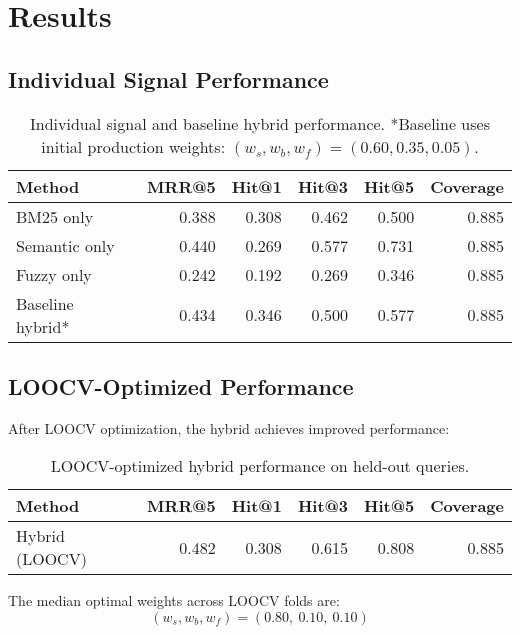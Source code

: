 \section{Results}
\label{sec:evaluation-results}

\subsection{Individual Signal Performance}

\begin{table}[!ht]
\centering
\small
\begin{tabular}{lrrrrr}
\toprule
\textbf{Method} & \textbf{MRR@5} & \textbf{Hit@1} & \textbf{Hit@3} & \textbf{Hit@5} & \textbf{Coverage} \\
\midrule
BM25 only      & 0.388 & 0.308 & 0.462 & 0.500 & 0.885 \\
Semantic only  & 0.440 & 0.269 & 0.577 & 0.731 & 0.885 \\
Fuzzy only     & 0.242 & 0.192 & 0.269 & 0.346 & 0.885 \\
\addlinespace
Baseline hybrid* & 0.434 & 0.346 & 0.500 & 0.577 & 0.885 \\
\bottomrule
\end{tabular}
\caption{Individual signal and baseline hybrid performance. *Baseline uses initial production weights: $(w_s,w_b,w_f)=(0.60,0.35,0.05)$.}
\label{tab:baselines}
\end{table}

\subsection{LOOCV-Optimized Performance}

After LOOCV optimization, the hybrid achieves improved performance:

\begin{table}[!ht]
\centering
\small
\begin{tabular}{lrrrrr}
\toprule
\textbf{Method} & \textbf{MRR@5} & \textbf{Hit@1} & \textbf{Hit@3} & \textbf{Hit@5} & \textbf{Coverage} \\
\midrule
Hybrid (LOOCV) & 0.482 & 0.308 & 0.615 & 0.808 & 0.885 \\
\bottomrule
\end{tabular}
\caption{LOOCV-optimized hybrid performance on held-out queries.}
\label{tab:loocv}
\end{table}

The median optimal weights across LOOCV folds are:
\[
\boxed{(w_s,w_b,w_f) = (0.80,\ 0.10,\ 0.10)}
\]

